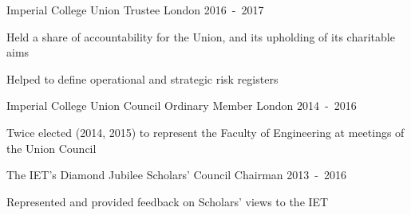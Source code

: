 \begin{cventries}
\nopagebreak

\cventry
  {Imperial College Union}
  {Trustee}
  {London}
  {2016~-~2017}
  {\begin{cvitems}
    \item {Held a share of accountability for the Union, and its upholding of its charitable aims}
    \item {Helped to define operational and strategic risk registers}
  \end{cvitems}}

\cventry
  {Imperial College Union Council}
  {Ordinary Member}
  {London}
  {2014~-~2016}
  {\begin{cvitems}
    \item {Twice elected (2014, 2015) to represent the Faculty of Engineering at meetings of the Union Council}
   \end{cvitems}}

\cventry
  {The IET's Diamond Jubilee Scholars' Council}
  {Chairman}
  {}
  {2013~-~2016}
  {\begin{cvitems}
    \item {Represented and provided feedback on Scholars' views to the IET}
  \end{cvitems}}
\end{cventries}
